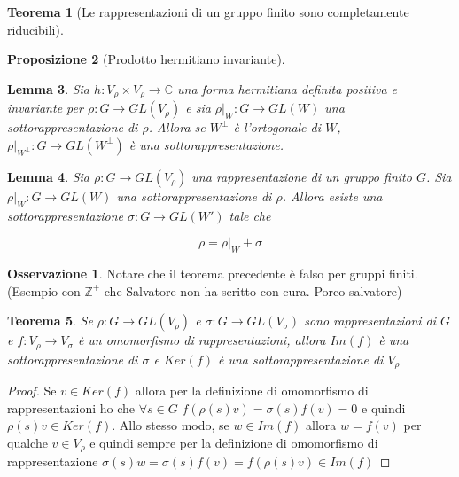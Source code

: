 \documentclass[11pt]{article}
\theoremstyle{plain}
\newtheorem{thm}{Teorema}[section]
\newtheorem{lemma}[thm]{Lemma}
\newtheorem{prop}[thm]{Proposizione}
\theoremstyle{definition}
\newtheorem*{rem}{Osservazione}
\theoremstyle{remark}
\newcommand{\C}{\mathbb{C}}
\begin{document}
\begin{thm}[Le rappresentazioni di un gruppo finito sono completamente riducibili]

\end{thm}

\begin{prop}[Prodotto hermitiano invariante]

\end{prop}


\begin{lemma}
Sia $h: V_\rho \times V_\rho \to \C$ una forma hermitiana definita positiva e invariante per $\rho: G \to GL(V_\rho)$ e sia $\rho|_W: G \to GL(W)$ una sottorappresentazione di $\rho$. Allora se $W^\perp$ è l'ortogonale di $W$, $\rho|_{W^\perp}: G \to GL(W^\perp)$ è una sottorappresentazione.




\end{lemma}






\begin{lemma}
Sia $\rho: G \to GL(V_\rho)$ una rappresentazione di un gruppo finito $G$. Sia $\rho|_W: G \to GL(W)$ una sottorappresentazione di $\rho$. Allora esiste una sottorappresentazione $\sigma: G \to GL(W')$ tale che

\[\rho = \rho|_W + \sigma \]
\end{lemma}






\begin{rem} Notare che il teorema precedente è falso per gruppi finiti. (Esempio con $\mathbb{Z}^+$ che Salvatore non ha scritto con cura. Porco salvatore)



\end{rem}



\begin{thm} Se $\rho: G \to GL(V_\rho)$ e $\sigma: G \to GL(V_\sigma)$ sono rappresentazioni di $G$ e $f: V_\rho \to V_\sigma$ è un omomorfismo di rappresentazioni, allora $Im(f)$ è una sottorappresentazione di $\sigma$ e $Ker(f)$ è una sottorappresentazione di $V_\rho$
\end{thm}
\begin{proof}
Se $v\in Ker(f)$ allora per la definizione di omomorfismo di rappresentazioni ho che $\forall s\in G$ $f(\rho(s)v)=\sigma(s)f(v)=0$ e quindi $\rho(s)v\in Ker(f)$. Allo stesso modo, se $w\in Im(f)$ allora $w=f(v)$ per qualche $v\in V_\rho$ e quindi sempre per la definizione di omomorfismo di rappresentazione $\sigma(s)w=\sigma(s)f(v)=f(\rho(s)v)\in Im(f)$
\end{proof}
\end{document}
